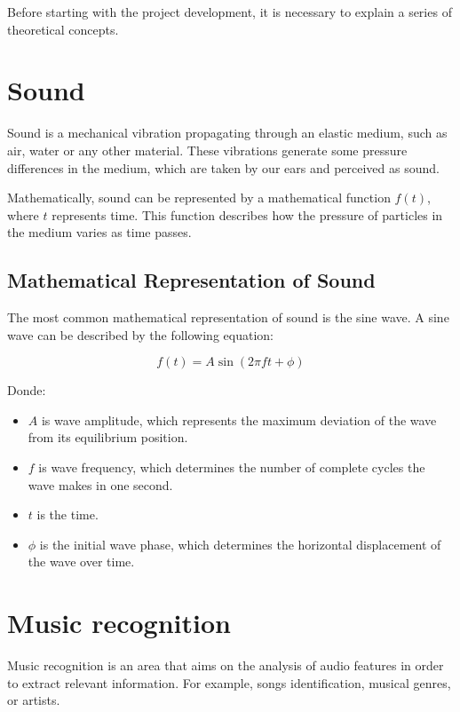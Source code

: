 
Before starting with the project development, it is necessary to explain a series of theoretical concepts.

\section{Sound}

Sound is a mechanical vibration propagating through an elastic medium, such as air, water or any other material. These vibrations generate some pressure differences in the medium, which are taken by our ears and perceived as sound.

Mathematically, sound can be represented by a mathematical function $f(t)$, where $t$ represents time. This function describes how the pressure of particles in the medium varies as time passes.

\subsection{Mathematical Representation of Sound}

The most common mathematical representation of sound is the sine wave. A sine wave can be described by the following equation:

\begin{equation}
f(t) = A \sin(2\pi ft + \phi)
\end{equation}

Donde:
\begin{itemize}
\item $A$ is wave amplitude, which represents the maximum deviation of the wave from its equilibrium position.
\item $f$ is wave frequency, which determines the number of complete cycles the wave makes in one second.
\item $t$ is the time.
\item $\phi$ is the initial wave phase, which determines the horizontal displacement of the wave over time.
\end{itemize}

\section{Music recognition}

Music recognition is an area that aims on the analysis of audio features in order to extract relevant information. For example, songs identification, musical genres, or artists.

